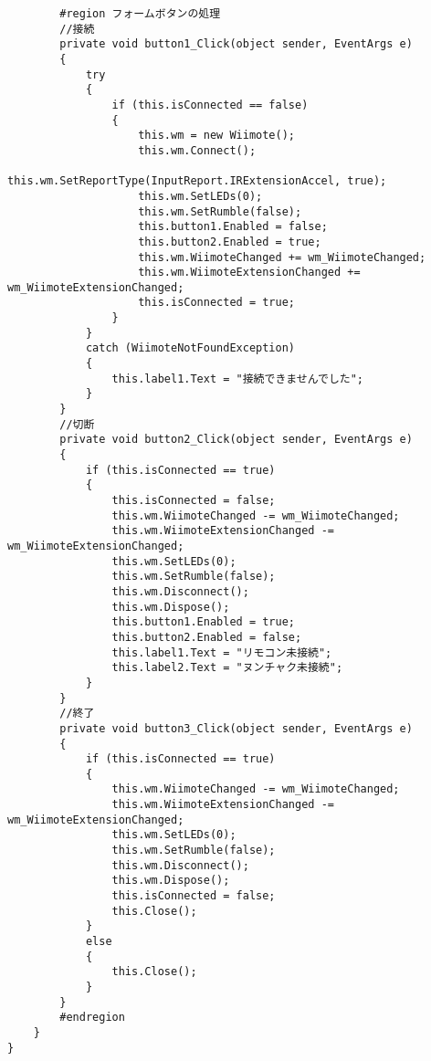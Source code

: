 \begin{verbatim}
        #region フォームボタンの処理
        //接続
        private void button1_Click(object sender, EventArgs e)
        {
            try
            {
                if (this.isConnected == false)
                {
                    this.wm = new Wiimote();
                    this.wm.Connect();
                    this.wm.SetReportType(InputReport.IRExtensionAccel, true);
                    this.wm.SetLEDs(0);
                    this.wm.SetRumble(false);
                    this.button1.Enabled = false;
                    this.button2.Enabled = true;
                    this.wm.WiimoteChanged += wm_WiimoteChanged;
                    this.wm.WiimoteExtensionChanged += wm_WiimoteExtensionChanged;
                    this.isConnected = true;
                }
            }
            catch (WiimoteNotFoundException)
            {
                this.label1.Text = "接続できませんでした";
            }
        }
        //切断
        private void button2_Click(object sender, EventArgs e)
        {
            if (this.isConnected == true)
            {
                this.isConnected = false;
                this.wm.WiimoteChanged -= wm_WiimoteChanged;
                this.wm.WiimoteExtensionChanged -= wm_WiimoteExtensionChanged;
                this.wm.SetLEDs(0);
                this.wm.SetRumble(false);
                this.wm.Disconnect();
                this.wm.Dispose();
                this.button1.Enabled = true;
                this.button2.Enabled = false;
                this.label1.Text = "リモコン未接続";
                this.label2.Text = "ヌンチャク未接続";
            }
        }
        //終了
        private void button3_Click(object sender, EventArgs e)
        {
            if (this.isConnected == true)
            {
                this.wm.WiimoteChanged -= wm_WiimoteChanged;
                this.wm.WiimoteExtensionChanged -= wm_WiimoteExtensionChanged;
                this.wm.SetLEDs(0);
                this.wm.SetRumble(false);
                this.wm.Disconnect();
                this.wm.Dispose();
                this.isConnected = false;
                this.Close();
            }
            else
            {
                this.Close();
            }
        }
        #endregion
    }
}
\end{verbatim}